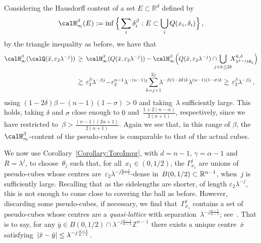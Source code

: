 \documentclass[biblatex]{pzorin-note}
\begin{document}
Considering the Hausdorff content of a set $E \subset \mathbb{R}^{d}$ defined by
\[
\calH^{\beta}_{\infty}(E) := \inf \Big\{ \sum_{i} \delta_{i}^{\beta} : E \subset \bigcup_{i} Q(x_i, \delta_i)\Big\} \, ,
\]
by the triangle inequality as before, we have that
\begin{equation}\nonumber%
\begin{split}
\calH^{\beta}_{\infty}(\calQ(\bar{x}, \varepsilon_{2} \lambda^{-j}) ) \, & \geq \, \calH^{\beta}_{\infty} (Q(\bar{x}, \varepsilon_{2} \lambda^{-j})) -
\calH^{\beta}_{\infty} \Big(Q(\bar{x}, \varepsilon_{2} \lambda^{-j}) \cap \!\!\!\! \bigcup_{j<k\le 2k} \!\!\! X^{k, \delta}_{\lambda^{k-j} t\theta_{k}} \Big)
\\
& \gtrsim \,
\varepsilon_{2}^{\beta} \lambda^{-\beta j} \! - \! \varepsilon_{2}^{n-1} \lambda^{-(n-1) j} \!\!\! \sum_{k=j+1}^{2j} \!\!\! \lambda^{- \beta (1-2\delta) k} \lambda^{ (n-1)(1-\sigma)k }
\gtrsim \, \varepsilon_{2}^{\beta} \lambda^{-\beta j} \, ,
\end{split}
\end{equation}
using
$ (1-2\delta) \beta - (n-1)(1 - \sigma) > 0$ and taking~$\lambda$ sufficiently
large. This holds, taking $\delta$ and $\sigma$ close enough to $0$ and~$\frac{1+2(n-\alpha) }{2(n+1)}$,
respectively, since we have restricted to~$\beta > \frac{(n-1)(2\alpha +1)}{2(n+1)}$.
Again we see that, in this range of $\beta$, the $\calH^{\beta}_{\infty}$-content of the pseudo-cubes is comparable to that of the
actual cubes.

We now use Corollary~\ref{Corollary:ToroImpr},
with $d=n-1$, $\gamma = \alpha-1$ and $R=\lambda^{j}$,
to choose~$\theta_j$ such that, for all~$x_{1}\in (0,1/2)$, the
$\Gamma_{\!x_1}^{j}$ are unions of pseudo-cubes whose
centres are~$\varepsilon_{2} \lambda^{-j\frac{\alpha-1}{n-1}}$-dense
in~$B(0,1/2) \subset \mathbb{R}^{n-1}$, when~$j$ is sufficiently large. Recalling that as the sidelengths are shorter, of length $\varepsilon_{2} \lambda^{-j}$, this is not enough to come close to covering the ball as before. However, discarding some pseudo-cubes, if necessary,
we find that~$\Gamma^{j}_{\!x_1}$ contains
a set of pseudo-cubes whose centres are
a {\it quasi-lattice} with separation~$\lambda^{-j\frac{\alpha-1}{n-1}}$; see~\cite[Lemma 4]{LuR2}.
That is to say, for any $\bar{y}\in B(0,1/2) \cap \lambda^{-j\frac{\alpha-1}{n-1}} \mathbb{Z}^{n-1}$
there exists a unique centre~$\bar{x}$
satisfying~$\lvert\bar{x} - \bar{y}\rvert \leq \lambda^{-j\frac{\alpha-1}{n-1}}$.
\end{document}
